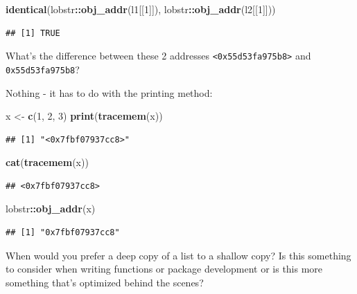 \documentclass[]{book}
\newenvironment{Shaded}{\begin{snugshade}}{\end{snugshade}}
\newcommand{\DecValTok}[1]{\textcolor[rgb]{0.00,0.00,0.81}{#1}}
\newcommand{\KeywordTok}[1]{\textcolor[rgb]{0.13,0.29,0.53}{\textbf{#1}}}
\newcommand{\NormalTok}[1]{#1}
\newcommand{\OperatorTok}[1]{\textcolor[rgb]{0.81,0.36,0.00}{\textbf{#1}}}
\newcommand{\StringTok}[1]{\textcolor[rgb]{0.31,0.60,0.02}{#1}}
\begin{document}
\begin{Shaded}
\begin{Highlighting}[]
\KeywordTok{identical}\NormalTok{(lobstr}\OperatorTok{::}\KeywordTok{obj_addr}\NormalTok{(l1[[}\DecValTok{1}\NormalTok{]]), lobstr}\OperatorTok{::}\KeywordTok{obj_addr}\NormalTok{(l2[[}\DecValTok{1}\NormalTok{]]))}
\end{Highlighting}
\end{Shaded}

\begin{verbatim}
## [1] TRUE
\end{verbatim}

What's the difference between these 2 addresses \texttt{\textless{}0x55d53fa975b8\textgreater{}} and \texttt{0x55d53fa975b8}?

Nothing - it has to do with the printing method:

\begin{Shaded}
\begin{Highlighting}[]
\NormalTok{x <-}\StringTok{ }\KeywordTok{c}\NormalTok{(}\DecValTok{1}\NormalTok{, }\DecValTok{2}\NormalTok{, }\DecValTok{3}\NormalTok{)}
\KeywordTok{print}\NormalTok{(}\KeywordTok{tracemem}\NormalTok{(x))}
\end{Highlighting}
\end{Shaded}

\begin{verbatim}
## [1] "<0x7fbf07937cc8>"
\end{verbatim}

\begin{Shaded}
\begin{Highlighting}[]
\KeywordTok{cat}\NormalTok{(}\KeywordTok{tracemem}\NormalTok{(x))}
\end{Highlighting}
\end{Shaded}

\begin{verbatim}
## <0x7fbf07937cc8>
\end{verbatim}

\begin{Shaded}
\begin{Highlighting}[]
\NormalTok{lobstr}\OperatorTok{::}\KeywordTok{obj_addr}\NormalTok{(x)}
\end{Highlighting}
\end{Shaded}

\begin{verbatim}
## [1] "0x7fbf07937cc8"
\end{verbatim}

When would you prefer a deep copy of a list to a shallow copy? Is this something to consider when writing functions or package development or is this more something that's optimized behind the scenes?
\end{document}
